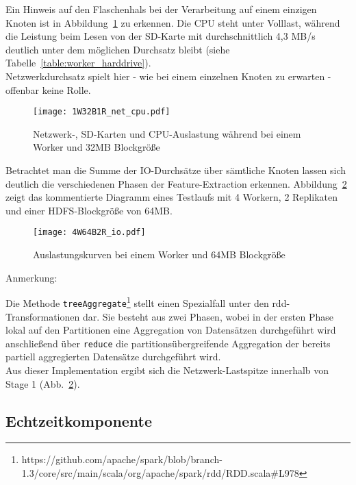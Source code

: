 Ein Hinweis auf den Flaschenhals bei der Verarbeitung auf einem einzigen Knoten ist in Abbildung~\ref{figure:1W32B1R_net_cpu} zu erkennen. Die CPU steht unter Volllast, während die Leistung beim Lesen von der SD-Karte mit durchschnittlich 4,3 MB/s deutlich unter dem möglichen Durchsatz bleibt (siehe Tabelle~\ref{table:worker_harddrive}).\\
Netzwerkdurchsatz spielt hier - wie bei einem einzelnen Knoten zu erwarten - offenbar keine Rolle.

\begin{figure}[ht!]
	\centering
  \texttt{[image: 1W32B1R\_net\_cpu.pdf]}
	\caption{Netzwerk-, SD-Karten und CPU-Auslastung während bei einem Worker und 32MB Blockgröße}
	\label{figure:1W32B1R_net_cpu}
\end{figure}

Betrachtet man die Summe der IO-Durchsätze über sämtliche Knoten lassen sich deutlich die verschiedenen Phasen der Feature-Extraction erkennen. Abbildung~\ref{figure:4W64B2R_io} zeigt das kommentierte Diagramm eines Testlaufs mit 4 Workern, 2 Replikaten und einer HDFS-Blockgröße von 64MB.

\begin{figure}[ht!]
	\centering
  \texttt{[image: 4W64B2R\_io.pdf]}
	\caption{Auslastungskurven bei einem Worker und 64MB Blockgröße}
	\label{figure:4W64B2R_io}
\end{figure}

\begin{labeling}{Anmerkung:~}
\item[Anmerkung:] Die Methode \lstinline|treeAggregate|\footnote{https://github.com/apache/spark/blob/branch-1.3/core/src/main/scala/org/apache/spark/rdd/RDD.scala\#L978} stellt einen Spezialfall unter den \gls{rdd}-
Transformationen dar. Sie besteht aus zwei Phasen, wobei in der ersten Phase lokal auf den Partitionen eine Aggregation von Datensätzen durchgeführt wird anschließend über \lstinline|reduce| die partitionsübergreifende Aggregation der bereits partiell aggregierten Datensätze durchgeführt wird.\\
Aus dieser Implementation ergibt sich die Netzwerk-Lastspitze innerhalb von Stage 1 (Abb.~\ref{figure:4W64B2R_io}).
\end{labeling}

\subsection{Echtzeitkomponente}

